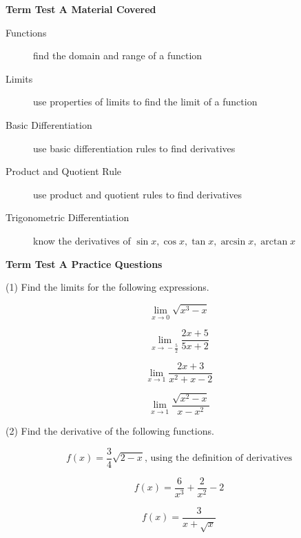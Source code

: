 \documentclass[11pt]{article}
\begin{document}
\textbf{Term Test A Material Covered}

\begin{description}
\item[Functions] find the domain and range of a function
\item[Limits] use properties of limits to find the limit of a
  function
\item[Basic Differentiation] use basic differentiation rules to find
  derivatives
\item[Product and Quotient Rule] use product and quotient rules
  to find derivatives
\item[Trigonometric Differentiation] know the derivatives of
  $\sin{}x,\cos{}x,\tan{}x,\arcsin{}x,\arctan{}x$
\end{description}

\textbf{Term Test A Practice Questions}

(1) Find the limits for the following expressions.

\begin{equation}
  \label{eq:ageebota}
  \lim_{x\rightarrow{}0}\sqrt{x^{3}-x}
\end{equation}

\begin{equation}
  \label{eq:lietefie}
  \lim_{x\rightarrow{}-\frac{5}{2}}\frac{2x+5}{5x+2}
\end{equation}

\begin{equation}
  \label{eq:waicahng}
  \lim_{x\rightarrow{}1}\frac{2x+3}{x^{2}+x-2}
\end{equation}

\begin{equation}
  \label{eq:moluoloh}
  \lim_{x\rightarrow{}1}\frac{\sqrt{x^{2}-x}}{x-x^{2}}
\end{equation}

(2) Find the derivative of the following functions.

\begin{equation}
  \label{eq:teeheeko}
  f(x)=\frac{3}{4}\sqrt{2-x}\mbox{, using the definition of derivatives}
\end{equation}

\begin{equation}
  \label{eq:xaumaezi}
  f(x)=\frac{6}{x^{3}}+\frac{2}{x^{2}}-2
\end{equation}

\begin{equation}
  \label{eq:utazeafa}
  f(x)=\frac{3}{x+\sqrt{x}}
\end{equation}
\end{document}
